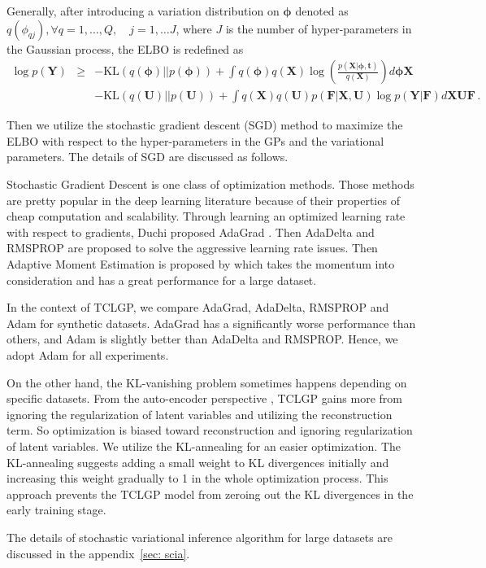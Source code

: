 \documentclass{article}
\begin{document}
Generally, after introducing a variation distribution on $\bm\phi$ denoted as $q(\phi_{qj}), \forall q = 1, \ldots, Q, \quad j = 1, \ldots J$, where $J$ is the number of hyper-parameters in the Gaussian process, the ELBO is redefined as 
\begin{eqnarray}
\log p(\bm Y) & \geq & -\mathrm{KL}(q(\bm \phi)|| p(\bm \phi)) + \int q(\bm{\phi}) q(\bm X) \log\left(\frac{p(\bm X| \bm \phi, \bm t)}{q(\bm X)}\right)d\bm{\phi}\bm X \nonumber \\
& & - \mathrm{KL}(q(\bm U) ||p(\bm U )) + \int q(\bm X) q(\bm U)p(\bm F|\bm X, \bm U)\log p(\bm Y| \bm F) d \bm X \bm U \bm F \,. \nonumber
\end{eqnarray}

Then we utilize the stochastic gradient descent (SGD) method to maximize the ELBO with respect to the hyper-parameters in the GPs and the variational parameters. The details of SGD are discussed as follows.

Stochastic Gradient Descent is one class of optimization methods. Those methods are pretty popular in the deep learning literature because of their properties of cheap computation and scalability. Through learning an optimized learning rate with respect to gradients, Duchi proposed AdaGrad \citep{Duchi_2011}. Then AdaDelta \citep{Zeiler_2012} and RMSPROP \citep{Hilton_2012} are proposed to solve the aggressive learning rate issues. Then Adaptive Moment Estimation is proposed by \cite{Kingma_2014} which takes the momentum into consideration and has a great performance for a large dataset.

In the context of TCLGP, we compare AdaGrad, AdaDelta, RMSPROP and Adam for synthetic datasets. AdaGrad has a significantly worse performance than others, and Adam is slightly better than AdaDelta and RMSPROP. Hence, we adopt Adam for all experiments.

On the other hand, the KL-vanishing problem sometimes happens depending on specific datasets. From the auto-encoder perspective \citep{Shen_2018}, TCLGP gains more from ignoring the regularization of latent variables and utilizing the reconstruction term. So optimization is biased toward reconstruction and ignoring regularization of latent variables. We utilize the KL-annealing \citep{Bowman_2015} for an easier optimization. The KL-annealing suggests adding a small weight to KL divergences initially and increasing this weight gradually to 1 in the whole optimization process. This approach prevents the TCLGP model from zeroing out the KL divergences in the early training stage.

The details of stochastic variational inference algorithm for large datasets are discussed in the appendix~\ref{sec: scia}.




\end{document}

